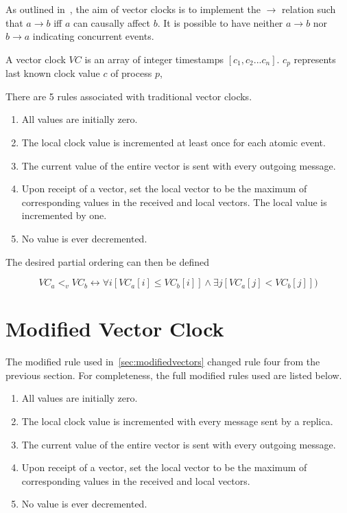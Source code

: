 \documentclass[12pt,a4paper,twoside,openright]{report}
\begin{document}
As outlined in~\cite{fidge1987}, the aim of vector clocks is to implement the $\rightarrow$ relation such that $ a \rightarrow b$ iff $a$ can causally affect $b$. It is possible to have neither $a \rightarrow b$ nor $b \rightarrow a$ indicating concurrent events.

A vector clock $VC$ is an array of integer timestamps $[c_1, c_2...c_n]$. $c_p$ represents last known clock value $c$ of process $p$, 

There are 5 rules associated with traditional vector clocks.
\begin{enumerate}
	\item All values are initially zero.
	\item The local clock value is incremented at least once for each atomic event.
	\item The current value of the entire vector is sent with every outgoing message.
	\item Upon receipt of a vector, set the local vector to be the maximum of corresponding values in the received and local vectors. The local value is incremented by one.
	\item No value is ever decremented.
\end{enumerate}

The desired partial ordering can then be defined

\[VC_a <_v VC_b \leftrightarrow \forall i[VC_a[i] \leq VC_b[i]] \land \exists j[VC_a[j] < VC_b[j]])\]



\section{Modified Vector Clock}
\label{appendix:modifiedvector}

The modified rule used in~\cref{sec:modifiedvectors} changed rule four from the previous section. For completeness, the full modified rules used are listed below.

\begin{enumerate}
	\item All values are initially zero.
	\item The local clock value is incremented with every message sent by a replica.
	\item The current value of the entire vector is sent with every outgoing message.
	\item Upon receipt of a vector, set the local vector to be the maximum of corresponding values in the received and local vectors.
	\item No value is ever decremented.
\end{enumerate}
\end{document}
